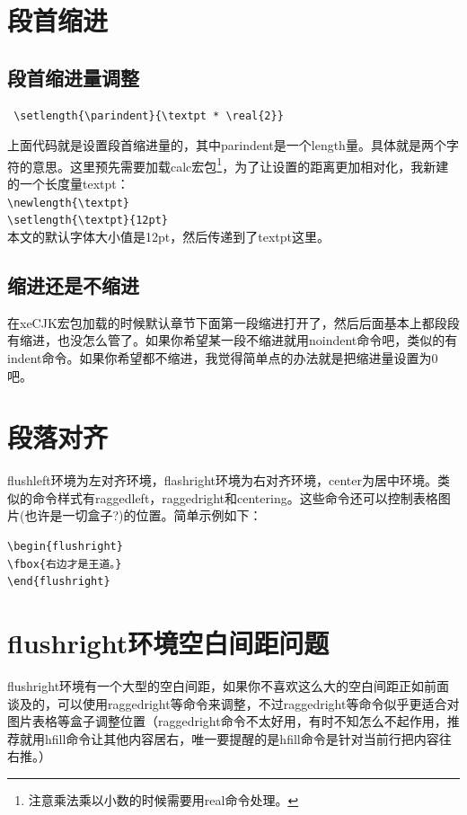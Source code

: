 \documentclass[11pt,oneside]{book}
\begin{document}
\section{段首缩进}
\subsection{段首缩进量调整}
\begin{Verbatim}
 \setlength{\parindent}{\textpt * \real{2}}
\end{Verbatim}

上面代码就是设置段首缩进量的，其中parindent是一个length量。具体就是两个字符的意思。这里预先需要加载calc宏包\footnote{注意乘法乘以小数的时候需要用real命令处理。}，为了让设置的距离更加相对化，我新建的一个长度量textpt：\\
\verb+\newlength{\textpt}+\\
\verb+\setlength{\textpt}{12pt}+\\ 
本文的默认字体大小值是12pt，然后传递到了textpt这里。


\subsection{缩进还是不缩进}
在xeCJK宏包加载的时候默认章节下面第一段缩进打开了，然后后面基本上都段段有缩进，也没怎么管了。如果你希望某一段不缩进就用noindent命令吧，类似的有indent命令。如果你希望都不缩进，我觉得简单点的办法就是把缩进量设置为0吧。



\section{段落对齐}
flushleft环境为左对齐环境，flashright环境为右对齐环境，center为居中环境。类似的命令样式有raggedleft，raggedright和centering。这些命令还可以控制表格图片(也许是一切盒子?)的位置。简单示例如下：

\begin{Verbatim}
\begin{flushright}
\fbox{右边才是王道。}
\end{flushright}
\end{Verbatim}
\begin{flushright}
\end{flushright}


\section{flushright环境空白间距问题}
flushright环境有一个大型的空白间距，如果你不喜欢这么大的空白间距正如前面谈及的，可以使用raggedright等命令来调整，不过raggedright等命令似乎更适合对图片表格等盒子调整位置（raggedright命令不太好用，有时不知怎么不起作用，推荐就用hfill命令让其他内容居右，唯一要提醒的是hfill命令是针对当前行把内容往右推。）
\end{document}
